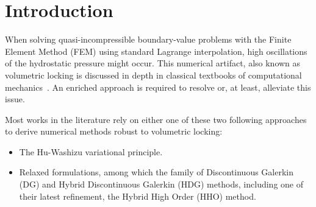 \section{Introduction}
\label{sec_introduction}



When solving quasi-incompressible boundary-value problems with the
Finite Element Method (FEM) using standard Lagrange interpolation, high
oscillations of the hydrostatic pressure might occur. This numerical
artifact, also known as volumetric locking is discussed in depth in
classical textbooks of computational
mechanics~\cite{simo_computational_1998, belytschko_nonlinear_nodate, neto_computational_2008}.
An enriched approach is required to resolve or, at least, alleviate
this issue.

Most works in the literature rely on either one of these two
following approaches to derive numerical methods robust to volumetric
locking:
\begin{itemize}
  \item The Hu-Washizu variational principle.
  \item Relaxed formulations, among which the family
  of Discontinuous Galerkin (DG) and Hybrid Discontinuous Galerkin (HDG)
  methods, including one of their latest refinement, the Hybrid High Order
  (HHO) method.
\end{itemize}


